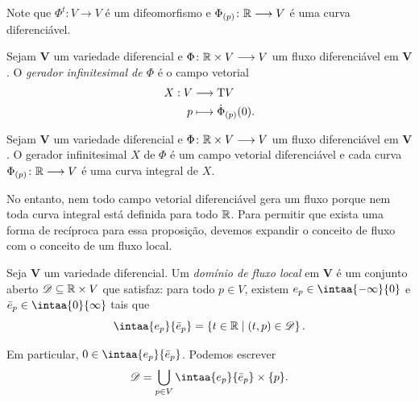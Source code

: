 Note que $\Phi^t\colon V \to V$ é um difeomorfismo e $\Phi_{(p)}\colon \mathbb{R} \longrightarrow V$ é uma curva diferenciável.

\begin{defi}
Sejam $\bm V$ um variedade diferencial e $\Phi\colon \mathbb{R} \times V \longrightarrow V$ um fluxo diferenciável em $\bm V$. O \emph{gerador infinitesimal de $\Phi$} é o campo vetorial
	\begin{align*}
	{X}: {V} &\longrightarrow {\mathrm{T}V} \\{p} &\longmapsto {\dot \Phi_{(p)}(0)}.
	\end{align*}
\end{defi}

\begin{prop}
Sejam $\bm V$ um variedade diferencial e $\Phi\colon \mathbb{R} \times V \longrightarrow V$ um fluxo diferenciável em $\bm V$. O gerador infinitesimal $X$ de $\Phi$ é um campo vetorial diferenciável e cada curva $\Phi_{(p)}\colon \mathbb{R} \longrightarrow V$ é uma curva integral de $X$.
\end{prop}

No entanto, nem todo campo vetorial diferenciável gera um fluxo porque nem toda curva integral está definida para todo $\mathbb{R}$. Para permitir que exista uma forma de recíproca para essa proposição, devemos expandir o conceito de fluxo com o conceito de um fluxo local.

\begin{defi}
Seja $\bm V$ um variedade diferencial. Um \emph{domínio de fluxo local} em $\bm V$ é um conjunto aberto $\mathscr{D} \subseteq \mathbb{R} \times V$ que satisfaz: para todo $p \in V$, existem $e_p \in \intaa{-\infty}{0}$ e $\bar e_p \in \intaa{0}{\infty}$ tais que
	\begin{equation*}
	\intaa{e_p}{\bar e_p} = \set{t \in \R}{(t,p) \in \mathscr{D}}.
	\end{equation*}
\end{defi}

Em particular, $0 \in \intaa{e_p}{\bar e_p}$. Podemos escrever
	\begin{equation*}
	\mathscr{D} = \bigcup_{p \in V} \intaa{e_p}{\bar e_p} \times \{p\}.
	\end{equation*}

